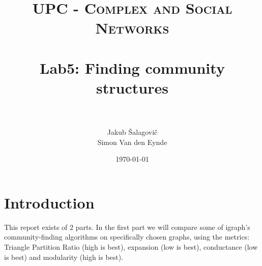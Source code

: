 \documentclass[paper=a4, fontsize=11pt]{scrartcl} %
\title{
\normalfont \normalsize
\textsc{UPC - Complex and Social Networks} \\ [25pt] %
\horrule{0.5pt} \\[0.4cm] %
\huge Lab5: Finding community structures \\ %
\horrule{2pt} \\[0.5cm] %
}
\author{Jakub Šalagovič\\Simon Van den Eynde} %
\date{\normalsize\today} %
\begin{document}
\maketitle %



\section{Introduction}
This report exists of $2$ parts. In the first part we will compare some of igraph's community-finding algorithms on specifically chosen graphs, using the metrics: Triangle Partition Ratio (high is best), expansion (low is best), conductance (low is best) and modularity (high is best).
\end{document}
